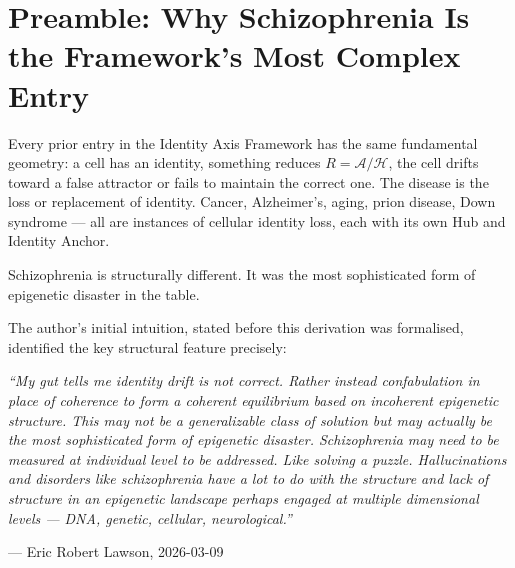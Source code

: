 \documentclass[12pt,a4paper]{article}
\newenvironment{derivenv}{%
  \begin{tcolorbox}[colback=lightgray,colframe=midgray,boxrule=0.5pt,
    arc=3pt,left=8pt,right=8pt,top=6pt,bottom=6pt,breakable]}{%
  \end{tcolorbox}}
\newcommand{\Rratio}{R}
\newcommand{\IA}{\mathcal{A}}
\newcommand{\Hub}{\mathcal{H}}
\begin{document}
\begin{abstract}
Nine falsifiable predictions are stated for the record,
all timestamped 2026-03-09. Zero structural contradictions
with the Identity Axis Theorem are present.

\medskip\noindent\textbf{Keywords:}
schizophrenia; attractor geometry; Waddington landscape;
parvalbumin interneuron; EZH2; LHX6; gamma oscillation;
false attractor; confabulation; Identity Axis; catatonia;
22q11.2 deletion; multi-circuit failure; PV interneuron;
PVALB; TDI-6118; GENUS protocol; principles-first derivation
\end{abstract}

\newpage
\tableofcontents
\newpage

\section{Preamble: Why Schizophrenia Is the Framework's
Most Complex Entry}

Every prior entry in the Identity Axis Framework has the same
fundamental geometry: a cell has an identity, something reduces
$\Rratio = \IA/\Hub$, the cell drifts toward a false attractor
or fails to maintain the correct one. The disease is the loss
or replacement of identity. Cancer, Alzheimer's, aging, prion
disease, Down syndrome --- all are instances of cellular identity
loss, each with its own Hub and Identity Anchor.

Schizophrenia is structurally different. It was the most
sophisticated form of epigenetic disaster in the table.

The author's initial intuition, stated before this derivation
was formalised, identified the key structural feature
precisely:

\begin{derivenv}
\textit{``My gut tells me identity drift is not correct.
Rather instead confabulation in place of coherence to form
a coherent equilibrium based on incoherent epigenetic
structure. This may not be a generalizable class of solution
but may actually be the most sophisticated form of epigenetic
disaster. Schizophrenia may need to be measured at individual
level to be addressed. Like solving a puzzle. Hallucinations
and disorders like schizophrenia have a lot to do with the
structure and lack of structure in an epigenetic landscape
perhaps engaged at multiple dimensional levels --- DNA,
genetic, cellular, neurological.''}

\medskip
--- Eric Robert Lawson, 2026-03-09
\end{derivenv}
\end{document}
